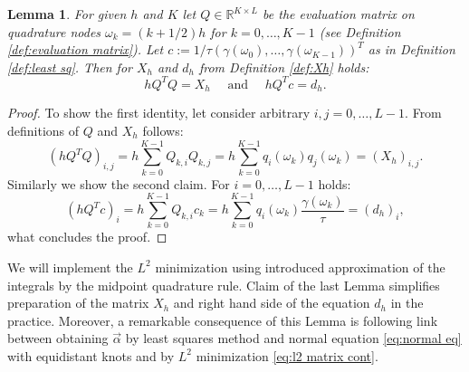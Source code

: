 \documentclass[a4paper,11pt,bibliography=totoc,listof=totoc,headinclude=true,cleardoublepage=empty,oneside]{scrbook}
\newtheorem{lemma}[theorem]{Lemma}
\newcommand{\R}{\mathbb{R}}
\begin{document}
    
\begin{lemma}\label{lemma:QTQ}
    For given $h$ and $K$ let $Q \in \R^{K\times L}$ be the evaluation matrix on quadrature nodes $\omega_k = (k+1/2)h$ for $k = 0, \dots, K-1$ (see Definition \ref{def:evaluation matrix}). Let $c := 1/\tau \left(\gamma(\omega_0), \dots, \gamma(\omega_{K-1})\right)^T$ as in Definition \ref{def:least sq}.
    Then for $X_h$ and $d_h$ from Definition \ref{def:Xh} holds: 
    \begin{equation*}\label{eq:link QTQ=X}
        h Q^T Q = X_h \quad \text{ and } \quad h Q^Tc = d_h.
    \end{equation*}
\end{lemma}
\begin{proof}
    To show the first identity, let consider arbitrary $i, j = 0, \dots, L-1$. From definitions of $Q$ and $X_h$ follows:
    \begin{equation*}
        \left(hQ^TQ\right)_{i,j} =  h \sum_{k=0}^{K-1} Q_{k,i} Q_{k,j} = h \sum_{k=0}^{K-1} q_i(\omega_k)q_j(\omega_k) = (X_h)_{i,j}.
    \end{equation*}
    Similarly we show the second claim. For $i = 0, \dots, L-1$ holds:
    \begin{equation*}
        \left(hQ^T c\right)_i = h \sum_{k=0}^{K-1} Q_{k,i}c_k = h\sum_{k=0}^{K-1} q_i(\omega_k) \frac{\gamma(\omega_k)}{\tau} = \left(d_h\right)_i,
    \end{equation*}
    what concludes the proof.
\end{proof}

We will implement the $L^2$ minimization using introduced approximation of the integrals by the midpoint quadrature rule. Claim of the last Lemma simplifies preparation of the matrix $X_h$ and right hand side of the equation $d_h$ in the practice. Moreover, a remarkable consequence of this Lemma is following link between obtaining $\Vec{\alpha}$ by least squares method and normal equation \eqref{eq:normal eq} with equidistant knots and by $L^2$ minimization \eqref{eq:l2 matrix cont}. 
\end{document}
